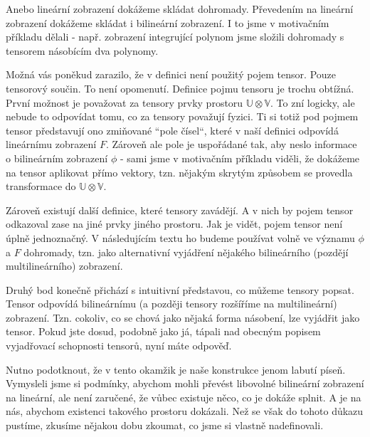 \documentclass[a5paper,12pt]{amsbook}
\theoremstyle{definition}
\newcommand{\myspace}[1]{\mathbb{#1}}
\begin{document}
Anebo lineární zobrazení dokážeme skládat dohromady. Převedením na lineární zobrazení dokážeme
skládat i bilineární zobrazení. I to jsme v motivačním příkladu dělali - např. zobrazení integrující
polynom jsme složili dohromady s tensorem násobícím dva polynomy.

Možná vás poněkud zarazilo, že v definici není použitý pojem tensor. Pouze tensorový součin.
To není opomenutí. Definice pojmu tensoru je trochu obtížná. První možnost je považovat
za tensory prvky prostoru $\myspace{U}\otimes\myspace{V}$. To zní logicky, ale nebude to
odpovídat tomu, co za tensory považují fyzici. Ti si totiž pod pojmem tensor představují
ono zmiňované ``pole čísel``, které v naší definici odpovídá lineárnímu zobrazení $F$.
Zároveň ale pole je uspořádané tak, aby neslo informace o bilineárním zobrazení $\phi$
- sami jsme v motivačním příkladu viděli, že dokážeme na tensor aplikovat přímo vektory,
tzn. nějakým skrytým způsobem se provedla transformace do $\myspace{U}\otimes\myspace{V}$.

Zároveň existují další definice, které tensory zavádějí. A v nich by pojem tensor odkazoval
zase na jiné prvky jiného prostoru. Jak je vidět, pojem tensor není úplně jednoznačný.
V následujícím textu ho budeme používat volně ve významu $\phi$ a $F$ dohromady, tzn. jako
alternativní vyjádření nějakého bilineárního (pozdějí multilineárního) zobrazení.

Druhý bod konečně přichází s intuitivní představou, co můžeme tensory popsat. Tensor odpovídá
bilineárnímu (a později tensory rozšíříme na multilineární) zobrazení. Tzn. cokoliv, co se
chová jako nějaká forma násobení, lze vyjádřit jako tensor. Pokud jste dosud, podobně jako já,
tápali nad obecným popisem vyjadřovací schopnosti tensorů, nyní máte odpověď.

Nutno podotknout, že v tento okamžik je naše konstrukce jenom labutí píseň. Vymysleli jsme si
podmínky, abychom mohli převést libovolné bilineární zobrazení na lineární, ale není zaručené,
že vůbec existuje něco, co je dokáže splnit. A je na nás, abychom existenci takového prostoru
dokázali. Než se však do tohoto důkazu pustíme, zkusíme nějakou dobu zkoumat, co jsme si
vlastně nadefinovali.
\end{document}
